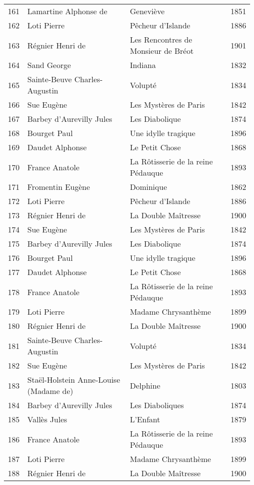 \begin{center}
\begin{small}
\begin{longtable}{l l l l}
  161 & Lamartine Alphonse de & Geneviève & 1851 \\
  162 & Loti Pierre & Pêcheur d’Islande & 1886 \\
  163 & Régnier Henri de & Les Rencontres de Monsieur de Bréot & 1901 \\
  164 & Sand George & Indiana & 1832 \\
  165 & Sainte-Beuve Charles-Augustin & Volupté & 1834 \\
  166 & Sue Eugène & Les Mystères de Paris & 1842 \\
  167 & Barbey d'Aurevilly Jules & Les Diabolique & 1874 \\
  168 & Bourget Paul & Une idylle tragique & 1896 \\
  169 & Daudet Alphonse & Le Petit Chose & 1868 \\
  170 & France Anatole & La Rôtisserie de la reine Pédauque & 1893 \\
  171 & Fromentin Eugène & Dominique & 1862 \\
  172 & Loti Pierre & Pêcheur d’Islande & 1886 \\
  173 & Régnier Henri de & La Double Maîtresse & 1900 \\
  174 & Sue Eugène & Les Mystères de Paris & 1842 \\
  175 & Barbey d'Aurevilly Jules & Les Diabolique & 1874 \\
  176 & Bourget Paul & Une idylle tragique & 1896 \\
  177 & Daudet Alphonse & Le Petit Chose & 1868 \\
  178 & France Anatole & La Rôtisserie de la reine Pédauque & 1893 \\
  179 & Loti Pierre & Madame Chrysanthème & 1899 \\
  180 & Régnier Henri de & La Double Maîtresse & 1900 \\
  181 & Sainte-Beuve Charles-Augustin & Volupté & 1834 \\
  182 & Sue Eugène & Les Mystères de Paris & 1842 \\
  183 & Staël-Holstein Anne-Louise (Madame de) & Delphine & 1803 \\
  184 & Barbey d'Aurevilly Jules & Les Diaboliques & 1874 \\
  185 & Vallès Jules & L'Enfant & 1879 \\
  186 & France Anatole & La Rôtisserie de la reine Pédauque & 1893 \\
  187 & Loti Pierre & Madame Chrysanthème & 1899 \\
  188 & Régnier Henri de & La Double Maîtresse & 1900 \\

\end{longtable}
\end{small}
\end{center}
